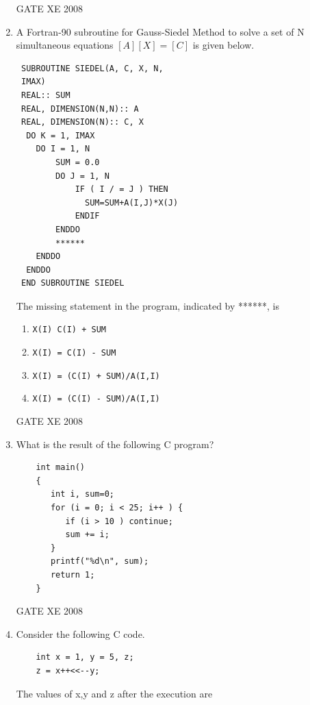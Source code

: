 \documentclass[12pt]{article}
\begin{document}
\begin{enumerate}[label=Q\arabic*.]
GATE XE 2008
\item A Fortran-90 subroutine for Gauss-Siedel Method to solve a set of N simultaneous equations $[A][X]=[C]$ is given below.
\begin{verbatim}
 SUBROUTINE SIEDEL(A, C, X, N,
 IMAX)
 REAL:: SUM
 REAL, DIMENSION(N,N):: A
 REAL, DIMENSION(N):: C, X
  DO K = 1, IMAX
    DO I = 1, N
        SUM = 0.0
        DO J = 1, N
            IF ( I / = J ) THEN
              SUM=SUM+A(I,J)*X(J)
            ENDIF
        ENDDO
        ******
    ENDDO
  ENDDO
 END SUBROUTINE SIEDEL
\end{verbatim}

The missing statement in the program, indicated by ******, is

\begin{enumerate}[label=(\Alph*)]
\item  \texttt{X(I) C(I) + SUM}

\item  \texttt{X(I) = C(I) - SUM}

\item  \texttt{X(I) = (C(I) + SUM)/A(I,I)}

\item  \texttt{X(I) = (C(I) - SUM)/A(I,I)}
\end{enumerate}

GATE XE 2008
\item  What is the result of the following C program?
\begin{verbatim}
    int main()
    {
       int i, sum=0;
       for (i = 0; i < 25; i++ ) {
          if (i > 10 ) continue;
          sum += i;
       }
       printf("%d\n", sum);
       return 1;
    }   
\end{verbatim}

\begin{enumerate}[label=(\Alph*)]
\end{enumerate}

GATE XE 2008
\item  Consider the following C code.
\begin{verbatim}
    int x = 1, y = 5, z;
    z = x++<<--y;

\end{verbatim}
The values of x,y and z after the execution are


\end{enumerate}
\end{document}
